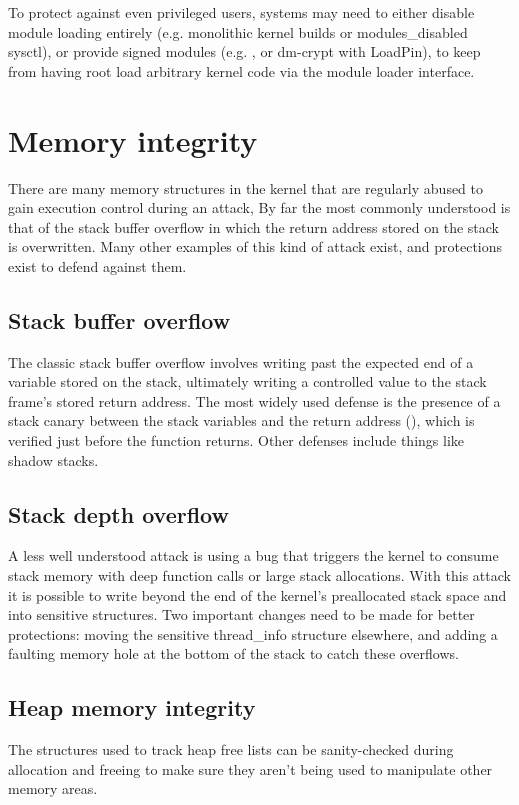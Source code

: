 \documentclass[a4paper,8pt,english]{sphinxmanual}
\begin{document}
To protect against even privileged users, systems may need to either
disable module loading entirely (e.g. monolithic kernel builds or
modules\_disabled sysctl), or provide signed modules (e.g.
, or dm-crypt with LoadPin), to keep from having
root load arbitrary kernel code via the module loader interface.


\section{Memory integrity}
\label{security/self-protection:memory-integrity}
There are many memory structures in the kernel that are regularly abused
to gain execution control during an attack, By far the most commonly
understood is that of the stack buffer overflow in which the return
address stored on the stack is overwritten. Many other examples of this
kind of attack exist, and protections exist to defend against them.


\subsection{Stack buffer overflow}
\label{security/self-protection:stack-buffer-overflow}
The classic stack buffer overflow involves writing past the expected end
of a variable stored on the stack, ultimately writing a controlled value
to the stack frame's stored return address. The most widely used defense
is the presence of a stack canary between the stack variables and the
return address (), which is verified just before
the function returns. Other defenses include things like shadow stacks.


\subsection{Stack depth overflow}
\label{security/self-protection:stack-depth-overflow}
A less well understood attack is using a bug that triggers the
kernel to consume stack memory with deep function calls or large stack
allocations. With this attack it is possible to write beyond the end of
the kernel's preallocated stack space and into sensitive structures. Two
important changes need to be made for better protections: moving the
sensitive thread\_info structure elsewhere, and adding a faulting memory
hole at the bottom of the stack to catch these overflows.


\subsection{Heap memory integrity}
\label{security/self-protection:heap-memory-integrity}
The structures used to track heap free lists can be sanity-checked during
allocation and freeing to make sure they aren't being used to manipulate
other memory areas.
\end{document}
